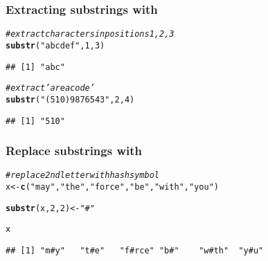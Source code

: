 \documentclass[12pt]{beamer}\usepackage[]{graphicx}\usepackage[]{color}
\makeatletter
\newcommand{\hlnum}[1]{\textcolor[rgb]{0.686,0.059,0.569}{#1}}%
\newcommand{\hlstr}[1]{\textcolor[rgb]{0.192,0.494,0.8}{#1}}%
\newcommand{\hlcom}[1]{\textcolor[rgb]{0.678,0.584,0.686}{\textit{#1}}}%
\newcommand{\hlstd}[1]{\textcolor[rgb]{0.345,0.345,0.345}{#1}}%
\newcommand{\hlkwb}[1]{\textcolor[rgb]{0.69,0.353,0.396}{#1}}%
\newcommand{\hlkwd}[1]{\textcolor[rgb]{0.737,0.353,0.396}{\textbf{#1}}}%
\newenvironment{kframe}{%
 \def\at@end@of@kframe{}%
 \ifinner\ifhmode%
  \def\at@end@of@kframe{\end{minipage}}%
  \begin{minipage}{\columnwidth}%
 \fi\fi%
 \def\FrameCommand##1{\hskip\@totalleftmargin \hskip-\fboxsep
 \colorbox{shadecolor}{##1}\hskip-\fboxsep
     \hskip-\linewidth \hskip-\@totalleftmargin \hskip\columnwidth}%
 \MakeFramed {\advance\hsize-\width
   \@totalleftmargin\z@ \linewidth\hsize
   \@setminipage}}%
 {\par\unskip\endMakeFramed%
 \at@end@of@kframe}
\newenvironment{knitrout}{}{} %
\makeatother
\begin{document}

\begin{frame}[fragile]
\frametitle{Extracting substrings with }

\begin{knitrout}\footnotesize
{}\color{fgcolor}\begin{kframe}
\begin{alltt}
\hlcom{# extract characters in positions 1, 2, 3}
\hlkwd{substr}\hlstd{(}\hlstr{"abcdef"}\hlstd{,} \hlnum{1}\hlstd{,} \hlnum{3}\hlstd{)}
\end{alltt}
\begin{verbatim}
## [1] "abc"
\end{verbatim}
\begin{alltt}
\hlcom{# extract 'area code' }
\hlkwd{substr}\hlstd{(}\hlstr{"(510) 987 6543"}\hlstd{,} \hlnum{2}\hlstd{,} \hlnum{4}\hlstd{)}
\end{alltt}
\begin{verbatim}
## [1] "510"
\end{verbatim}
\end{kframe}
\end{knitrout}

\end{frame}


\begin{frame}[fragile]
\frametitle{Replace substrings with }

\begin{knitrout}\footnotesize
{}\color{fgcolor}\begin{kframe}
\begin{alltt}
\hlcom{# replace 2nd letter with hash symbol}
\hlstd{x} \hlkwb{<-} \hlkwd{c}\hlstd{(}\hlstr{"may"}\hlstd{,} \hlstr{"the"}\hlstd{,} \hlstr{"force"}\hlstd{,} \hlstr{"be"}\hlstd{,} \hlstr{"with"}\hlstd{,} \hlstr{"you"}\hlstd{)}

\hlkwd{substr}\hlstd{(x,} \hlnum{2}\hlstd{,} \hlnum{2}\hlstd{)} \hlkwb{<-} \hlstr{"#"}

\hlstd{x}
\end{alltt}
\begin{verbatim}
## [1] "m#y"   "t#e"   "f#rce" "b#"    "w#th"  "y#u"
\end{verbatim}
\end{kframe}
\end{knitrout}

\end{frame}
\end{document}
